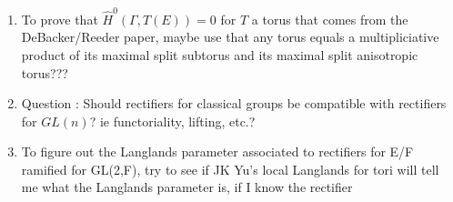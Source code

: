 \documentclass{article}
\begin{document}
\begin{enumerate}
\item To prove that $\hat{H}^0(\Gamma, T(E)) = 0$ for $T$ a torus that comes from the DeBacker/Reeder paper, maybe use that any torus equals a multipliciative product of its maximal split subtorus and its maximal split anisotropic torus???

\item Question : Should rectifiers for classical groups be compatible with rectifiers for $GL(n)$? ie functoriality, lifting, etc.?

\item To figure out the Langlands parameter associated to rectifiers for E/F ramified for GL(2,F), try to see if JK Yu's local Langlands for tori will tell me what the Langlands parameter is, if I know the rectifier


\end{enumerate}
\end{document}
